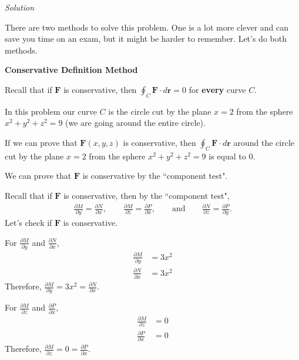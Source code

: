 \documentclass{article}
\renewcommand{\r}[0]{\mathbf{r}}
\newcommand{\F}[0]{\mathbf{F}}
\newcommand{\Solution}{\textit{Solution}}
\begin{document}
\Solution

There are two methods to solve this problem. One is a lot more clever and can save you time on an exam, but it might be harder to remember. Let's do both methods.

{}\textbf{Conservative Definition Method}

Recall that if $\F$ is conservative, then $\displaystyle\oint_C \F\cdot d\r=0$ for \textbf{every} curve $C$.

In this problem our curve $C$ is the circle cut by the plane $x=2$ from the sphere $x^2+y^2+z^2=9$ (we are going around the entire circle). 

If we can prove that $\F(x,y,z)$ is conservative, then  $\displaystyle\oint_C \F\cdot d\r$ around the circle cut by the plane $x=2$ from the sphere $x^2+y^2+z^2=9$ is equal to $0$.

We can prove that $\F$ is conservative by the ``component test".

Recall that if $\F$ is conservative, then by the ``component test",
\begin{align*}
    \frac{\partial M}{\partial y}=\frac{\partial N}{\partial x},\hspace{2em}\frac{\partial M}{\partial z}=\frac{\partial P}{\partial x},\hspace{2em} \text{and}\hspace{2em}\frac{\partial N}{\partial z}=\frac{\partial P}{\partial y}.
\end{align*}
Let's check if $\F$ is conservative.

{}
For $\displaystyle \frac{\partial M}{\partial y}$ and $\displaystyle \frac{\partial N}{\partial x}$,
\begin{align*}
    \frac{\partial M}{\partial y}&=3x^2\\
    \frac{\partial N}{\partial x}&=3x^2
\end{align*}
Therefore, $\displaystyle \frac{\partial M}{\partial y}=3x^2=\displaystyle \frac{\partial N}{\partial x}$.

{}
For $\displaystyle \frac{\partial M}{\partial z}$ and $\displaystyle\frac{\partial P}{\partial x}$,
\begin{align*}
    \frac{\partial M}{\partial z}&=0\\
    \frac{\partial P}{\partial x}&=0
\end{align*}
Therefore, $\displaystyle \frac{\partial M}{\partial z}=0=\displaystyle\frac{\partial P}{\partial x}$.
\end{document}

